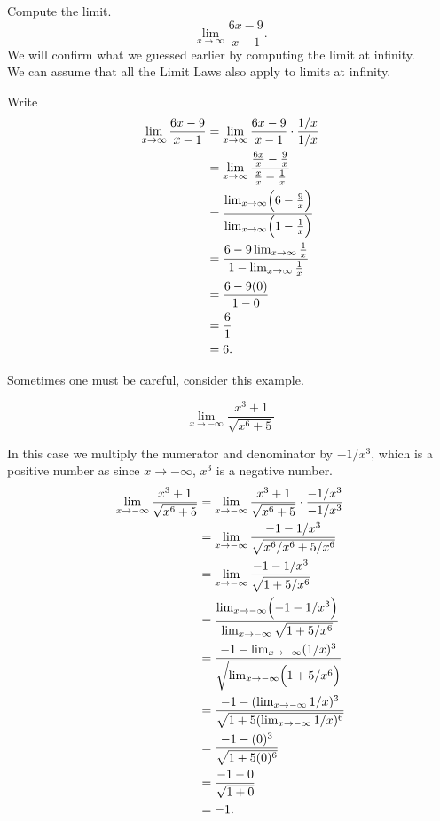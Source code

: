 \documentclass{ximera}
\begin{document}
\begin{example}  Compute the limit.
\[
\lim_{x\to\infty} \frac{6x-9}{x-1}.
\]
We will confirm what we guessed earlier by computing the limit at infinity.\\
 We can assume that all the Limit Laws also apply to limits at infinity.
\begin{explanation}
Write
\begin{align*}
\lim_{x\to\infty}\frac{6x-9}{x-1} &= \lim_{x\to\infty}\frac{6x-9}{x-1}\cdot \frac{1/x}{1/x}\\
&=\lim_{x\to\infty}\frac{\frac{6x}{x} - \frac{9}{x}}{\frac{x}{x} - \frac{1}{x}}\\
&=\frac{\lim_{x\to\infty}\Bigl(6- \frac{9}{x}\Bigr)}{\lim_{x\to\infty}\Bigl(1- \frac{1}{x}\Bigr)}\\
&=\frac{6-9\lim_{x\to\infty}  \frac{1}{x}}{1-\lim_{x\to\infty} \frac{1}{x}}\\
&=\frac{6-9(0)}{1-0}\\
&=  \frac{6}{1}\\
&= 6.
\end{align*}
\end{explanation}
\end{example}

Sometimes one must be careful, consider this example.

\begin{example}

\[
\lim_{x\to -\infty} \frac{x^3+1}{\sqrt{x^6+5}}
\]
\begin{explanation}
In this case we multiply the numerator and denominator by $-1/x^3$,
which is a positive number as since $x\to -\infty$, $x^3$ is a negative
number.
\begin{align*}
\lim_{x\to -\infty} \frac{x^3+1}{\sqrt{x^6+5}} &= \lim_{x\to -\infty} \frac{x^3+1}{\sqrt{x^6+5}} \cdot \frac{-1/x^3}{-1/x^3}\\
&= \lim_{x\to -\infty} \frac{-1-1/x^3}{\sqrt{x^6/x^6+5/x^6}}\\
&= \lim_{x\to -\infty} \frac{-1-1/x^3}{\sqrt{1+5/x^6}}\\
&= \frac{ \lim_{x\to -\infty}\Bigl(-1-1/x^3\Bigr)}{\lim_{x\to -\infty}\sqrt{1+5/x^6}}\\
&= \frac{ -1-\lim_{x\to -\infty}(1/x)^3}{\sqrt{\lim_{x\to -\infty}\Bigl(1+5/x^6\Bigr)}}\\
&= \frac{ -1-(\lim_{x\to -\infty}1/x)^3}{\sqrt{1+5(\lim_{x\to -\infty}1/x)^6}}\\
&= \frac{ -1-(0)^3}{\sqrt{1+5(0)^6}}\\
&= \frac{ -1-0}{\sqrt{1+0}}\\
&= -1.
\end{align*}
\end{explanation}
\end{example}
\end{document}
